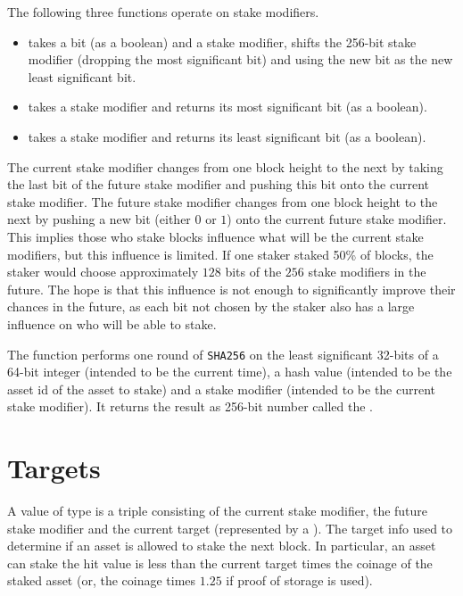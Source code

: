 The following three functions operate on stake modifiers.
\begin{itemize}
\item {} takes a bit (as a boolean) and a stake modifier, shifts the 256-bit stake modifier (dropping the most significant bit) and using the new bit as the new least significant bit.
\item {} takes a stake modifier and returns its most significant bit (as a boolean).
\item {} takes a stake modifier and returns its least significant bit (as a boolean).
\end{itemize}
The current stake modifier changes from one block height to the next by
taking the last bit of the future stake modifier and pushing this bit onto the current stake modifier.
The future stake modifier changes from one block height to the next by
pushing a new bit (either $0$ or $1$) onto the current future stake modifier.
This implies those who stake blocks influence what will be the current stake modifiers,
but this influence is limited. If one staker staked 50\% of blocks, the staker would
choose approximately $128$ bits of the $256$ stake modifiers in the future.
The hope is that this influence is not enough to significantly improve their
chances in the future, as each bit not chosen by the staker also has a large influence
on who will be able to stake.

The function {} performs one round of
{\tt{SHA256}} on the least significant 32-bits of a 64-bit integer (intended to be the current time),
a hash value (intended to be the asset id of the asset to stake) and a stake modifier (intended to be the current stake modifier).
It returns the result as 256-bit number called the {}.

\section{Targets}

A value of type {} is a triple
consisting of the current stake modifier,
the future stake modifier
and the current target (represented by a {}).
The target info used to determine if an asset
is allowed to stake the next block.
In particular, an asset can stake
the hit value is less than the current target times the coinage of the staked asset
(or, the coinage times $1.25$
if proof of storage is used).

